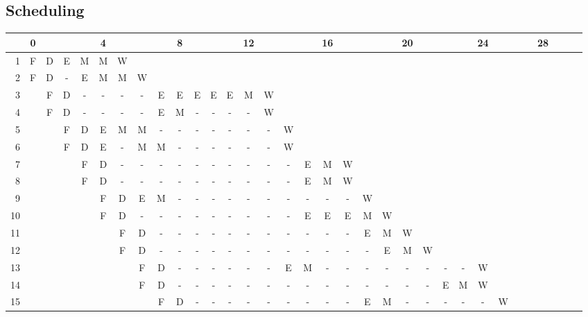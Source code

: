 \subsection{Scheduling}
{\tiny
\begin{tabular}{ |r |c c c c|c c c c|c c c c|c c c c|c c c c|c c c c|c c c c|c
    c c c|}
  \hline
  & 0 & & & &4& & & &8& & & &12& & & &16& & & &20& & & &24& & & &28& & & \\
  \hline
  1 &F&D&E&M&M&W& & & & & & & & & & & & & & & & & & & & & & & & & & \\
  2 &F&D&-&E&M&M&W& & & & & & & & & & & & & & & & & & & & & & & & & \\
  3 & &F&D&-&-&-&-&E&E&E&E&E&M&W& & & & & & & & & & & & & & & & & & \\
  4 & &F&D&-&-&-&-&E&M&-&-&-&-&W& & & & & & & & & & & & & & & & & & \\
  \hline
  5 & & &F&D&E&M&M&-&-&-&-&-&-&-&W& & & & & & & & & & & & & & & & & \\
  6 & & &F&D&E&-&M&M&-&-&-&-&-&-&W& & & & & & & & & & & & & & & & & \\
  7 & & & &F&D&-&-&-&-&-&-&-&-&-&-&E&M&W& & & & & & & & & & & & & & \\
  8 & & & &F&D&-&-&-&-&-&-&-&-&-&-&E&M&W& & & & & & & & & & & & & & \\
  \hline
  9  & & & & &F&D&E&M&-&-&-&-&-&-&-&-&-&-&W& & & & & & & & & & & & & \\
  10 & & & & &F&D&-&-&-&-&-&-&-&-&-&E&E&E&M&W& & & & & & & & & & & & \\
  11 & & & & & &F&D&-&-&-&-&-&-&-&-&-&-&-&E&M&W& & & & & & & & & & & \\
  12 & & & & & &F&D&-&-&-&-&-&-&-&-&-&-&-&-&E&M&W& & & & & & & & & & \\
  \hline
  13 & & & & & & &F&D&-&-&-&-&-&-&E&M&-&-&-&-&-&-&-&-&W& & & & & & & \\
  14 & & & & & & &F&D&-&-&-&-&-&-&-&-&-&-&-&-&-&-&E&M&W& & & & & & & \\
  15 & & & & & & & &F&D&-&-&-&-&-&-&-&-&-&E&M&-&-&-&-&-&W& & & & & & \\
  \hline

\end{tabular}

}
